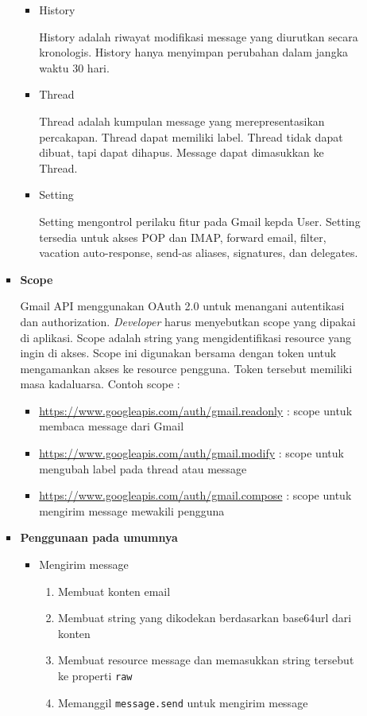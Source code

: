 \documentclass[a4paper,twoside]{article}
\begin{document}
\begin{enumerate}
\begin{enumerate}
\begin{itemize}
\begin{itemize}
\item History

History adalah riwayat modifikasi message yang diurutkan secara kronologis. History hanya menyimpan perubahan dalam jangka waktu 30 hari.

\item Thread

Thread adalah kumpulan message yang merepresentasikan percakapan. Thread dapat memiliki label. Thread tidak dapat dibuat, tapi dapat dihapus. Message dapat dimasukkan ke Thread.

\item Setting

Setting mengontrol perilaku fitur pada Gmail kepda User. Setting tersedia untuk akses POP dan IMAP, forward email, filter, vacation auto-response, send-as aliases, signatures, dan delegates.

\end{itemize}
			
			\item \textbf{Scope}
			
			Gmail API menggunakan OAuth 2.0 untuk menangani autentikasi dan authorization. \textit{Developer} harus menyebutkan scope yang dipakai di aplikasi. Scope adalah string yang mengidentifikasi resource yang ingin di akses. Scope ini digunakan bersama dengan token untuk mengamankan akses ke resource pengguna. Token tersebut memiliki masa kadaluarsa. Contoh scope :
\begin{itemize}
\item \url{https://www.googleapis.com/auth/gmail.readonly} : scope untuk membaca message dari Gmail
\item \url{https://www.googleapis.com/auth/gmail.modify} : scope untuk mengubah label pada thread atau message
\item \url{https://www.googleapis.com/auth/gmail.compose} : scope untuk mengirim message mewakili pengguna
\end{itemize}
			
			\item \textbf{Penggunaan pada umumnya}
			
			\begin{itemize}
				\item Mengirim message

\begin{enumerate}
\item Membuat konten email
\item Membuat string yang dikodekan berdasarkan base64url dari konten
\item Membuat resource message dan memasukkan string tersebut ke properti \texttt{raw}
\item Memanggil \texttt{message.send} untuk mengirim message
\end{enumerate}


\end{itemize}
\end{itemize}
\end{enumerate}
\end{enumerate}
\end{document}
